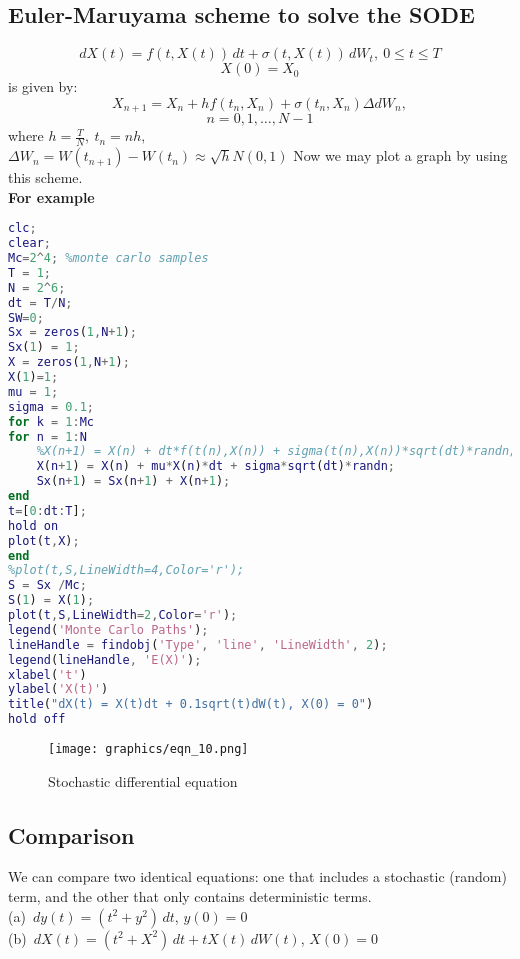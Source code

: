 \documentclass[twoside,final]{hcmut-report}
\begin{document}
\subsection{Euler-Maruyama scheme to solve the SODE}

\[dX(t) = f(t,X(t))\,dt + \sigma(t,X(t))\,dW_t,\ 0 \leq t \leq T \]
      \[X(0) = X_0\]
      is given by:
      \[X_{n+1} = X_n + hf(t_n,X_n) + \sigma(t_n,X_n)\Delta dW_n,\]  \[n=0,1,\dots,N-1\]
      where $h=\frac{T}{N}, \ t_n = nh,$\\
      $ \Delta W_n = W(t_{n+1}) - W(t_n) \approx \sqrt{h}N(0,1)$
      Now we may plot a graph by using this scheme.\\

      \textbf{For example}
   \begin{lstlisting}[language=Matlab, caption={My MATLAB Code}, label={lst:matlabcode}]
  clc; 
clear;
Mc=2^4; %monte carlo samples
T = 1;
N = 2^6;
dt = T/N;
SW=0;
Sx = zeros(1,N+1);
Sx(1) = 1;
X = zeros(1,N+1);
X(1)=1;
mu = 1;
sigma = 0.1;
for k = 1:Mc
for n = 1:N   
    %X(n+1) = X(n) + dt*f(t(n),X(n)) + sigma(t(n),X(n))*sqrt(dt)*randn;
    X(n+1) = X(n) + mu*X(n)*dt + sigma*sqrt(dt)*randn;
    Sx(n+1) = Sx(n+1) + X(n+1);  
end
t=[0:dt:T];
hold on
plot(t,X);
end
%plot(t,S,LineWidth=4,Color='r');
S = Sx /Mc;
S(1) = X(1);
plot(t,S,LineWidth=2,Color='r');
legend('Monte Carlo Paths');
lineHandle = findobj('Type', 'line', 'LineWidth', 2);
legend(lineHandle, 'E(X)');
xlabel('t')
ylabel('X(t)')
title("dX(t) = X(t)dt + 0.1sqrt(t)dW(t), X(0) = 0")
hold off

\end{lstlisting}   


\begin{figure}[h]
      \centering
                    \texttt{[image: graphics/eqn\_10.png]}
                    \caption{Stochastic differential equation}
    \end{figure}
    
\pagebreak
\subsection{Comparison}
We can compare two identical equations: one that includes a stochastic (random) term, and the other that only contains deterministic terms.\\
(a) $\,dy(t) = (t^2 + y^2)\,dt$, $y(0) = 0$\\
(b) $\,dX(t) = (t^2 + X^2)\,dt + tX(t)\,dW(t)$, $X(0) = 0$\\
\end{document}
